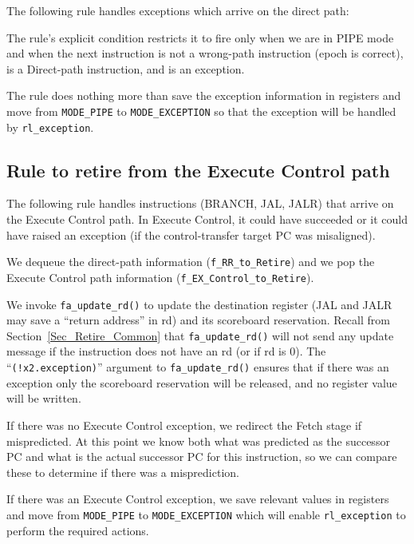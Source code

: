The following rule handles exceptions which arrive on the direct path:


The rule's explicit condition restricts it to fire only when we are in
PIPE mode and when the next instruction is not a wrong-path
instruction (epoch is correct), is a Direct-path instruction, and is
an exception.

The rule does nothing more than save the exception information in
registers and move from \verb|MODE_PIPE| to \verb|MODE_EXCEPTION| so
that the exception will be handled by \verb|rl_exception|.


\subsection{Rule to retire from the Execute Control path}

\label{Sec_Fife_Retire_Control}

The following rule handles instructions (BRANCH, JAL, JALR) that
arrive on the Execute Control path.  In Execute Control, it could have
succeeded or it could have raised an exception (if the
control-transfer target PC was misaligned).


We dequeue the direct-path information (\verb|f_RR_to_Retire|) and we
pop the Execute Control path information
(\verb|f_EX_Control_to_Retire|).

We invoke \verb|fa_update_rd()| to update the destination register
(JAL and JALR may save a ``return address'' in rd) and its scoreboard
reservation.  Recall from Section~\ref{Sec_Retire_Common} that
\verb|fa_update_rd()| will not send any update message if the
instruction does not have an rd (or if rd is 0).  The
``\verb|(!x2.exception)|'' argument to \verb|fa_update_rd()| ensures
that if there was an exception only the scoreboard reservation will be
released, and no register value will be written.

If there was no Execute Control exception, we redirect the Fetch stage
if mispredicted.  At this point we know both what was predicted as the
successor PC and what is the actual successor PC for this instruction,
so we can compare these to determine if there was a misprediction.

If there was an Execute Control exception, we save relevant values in
registers and move from \verb|MODE_PIPE| to \verb|MODE_EXCEPTION|
which will enable \verb|rl_exception| to perform the required actions.

